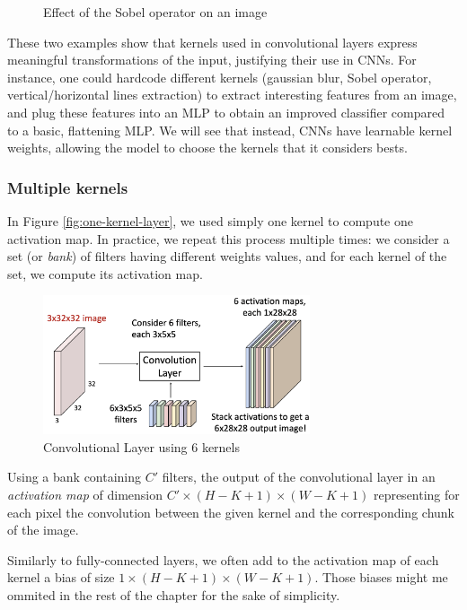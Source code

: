 \begin{example}
\begin{figure}[H]
        \caption{Effect of the Sobel operator on an image}
    \end{figure}
\end{example}

These two examples show that kernels used in convolutional layers express meaningful transformations of the input, justifying their use in CNNs. For instance, one could hardcode different kernels (gaussian blur, Sobel operator, vertical/horizontal lines extraction) to extract interesting features from an image, and plug these features into an MLP to obtain an improved classifier compared to a basic, flattening MLP. We will see that instead, CNNs have learnable kernel weights, allowing the model to choose the kernels that it considers bests.

\subsubsection{Multiple kernels}
In Figure \ref{fig:one-kernel-layer}, we used simply one kernel to compute one activation map. In practice, we repeat this process multiple times: we consider a set (or \emph{bank}) of filters having different weights values, and for each kernel of the set, we compute its activation map.
\begin{figure}[H]
    \centering
    \includegraphics[width=0.7\textwidth]{images/multiple-kernels.png}
    \caption{Convolutional Layer using 6 kernels}
\end{figure}
Using a bank containing $C'$ filters, the output of the convolutional layer in an \emph{activation map} of dimension $C'\times (H - K + 1) \times (W - K + 1)$ representing for each pixel the convolution between the given kernel and the corresponding chunk of the image.

\begin{remark}
    Similarly to fully-connected layers, we often add to the activation map of each kernel a bias of size $1\times (H - K + 1) \times (W - K + 1)$. Those biases might me ommited in the rest of the chapter for the sake of simplicity.
\end{remark}

